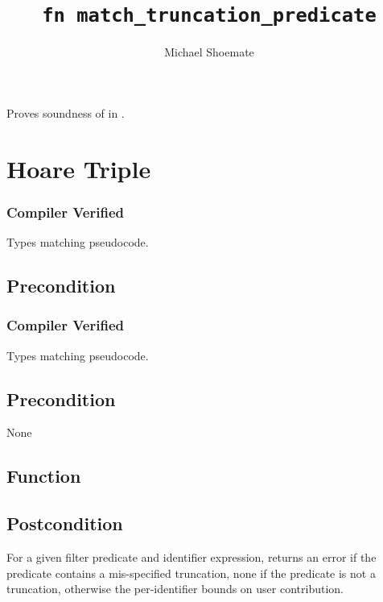 \documentclass{article}
\title{\texttt{fn match\_truncation\_predicate}}
\author{Michael Shoemate}
\begin{document}
\maketitle  


\contrib

Proves soundness of  
in .

\section{Hoare Triple}
\subsubsection*{Compiler Verified}
Types matching pseudocode.

\subsection*{Precondition}
\subsubsection*{Compiler Verified}
Types matching pseudocode.

\subsection*{Precondition}
None 

\subsection*{Function}
\label{sec:python-pseudocode}


\subsection*{Postcondition}
\begin{theorem}[Postcondition]
    For a given filter predicate and identifier expression,
    returns an error if the predicate contains a mis-specified truncation,
    none if the predicate is not a truncation,
    otherwise the per-identifier bounds on user contribution.
\end{theorem}
\end{document}
